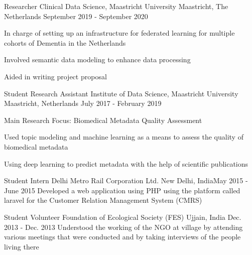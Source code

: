 \begin{cventries}
\cventry
    {Researcher}
    {Clinical Data Science, Maastricht University}
    {Maastricht, The Netherlands}
    {September 2019 - September 2020}
    {\begin{cvitems}
    \item {In charge of setting up an infrastructure for federated learning for multiple cohorts of Dementia in the Netherlands}
    \item {Involved semantic data modeling to enhance data processing}
    \item {Aided in writing project proposal}
    \end{cvitems}}
    
  \cventry
    {Student Research Assistant}
    {Institute of Data Science, Maastricht University}
    {Maastricht, Netherlands}
    {July 2017 - February 2019}
    {\begin{cvitems}
        \item {Main Research Focus: Biomedical Metadata Quality Assessment}
        \item {Used topic modeling and machine learning as a means to assess the quality of biomedical metadata}
        \item {Using deep learning to predict metadata with the help of scientific publications}
      \end{cvitems}}
  \cventry
  {Student Intern}
  {Delhi Metro Rail Corporation Ltd.}
  {New Delhi, India}{May 2015 - June 2015}
  {Developed a web application using PHP using the platform called laravel for the Customer Relation Management System (CMRS)}
  
  \cventry
  {Student Volunteer}
  {Foundation of Ecological Society (FES)}
  {Ujjain, India}
  {Dec. 2013 - Dec. 2013}
  {Understood the working of the NGO at village by attending various meetings that were conducted and by taking interviews of the people living there}
\end{cventries}